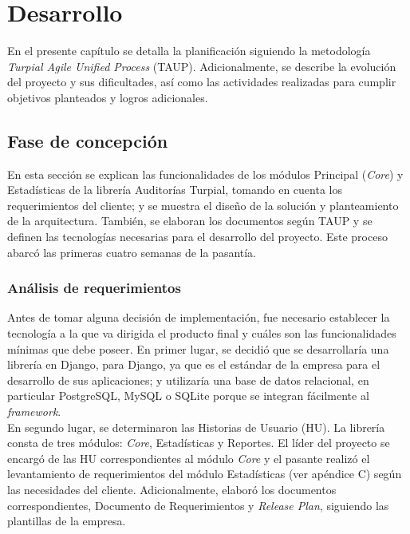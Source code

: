 \chapter{\textbf{Desarrollo}}

\thispagestyle{empty}

En el presente capítulo se detalla la planificación siguiendo la metodología \textit{Turpial Agile Unified Process} (TAUP). Adicionalmente, se describe la evolución del proyecto y sus dificultades, así como las actividades realizadas para cumplir objetivos planteados y logros adicionales.

\section{Fase de concepción}

En esta sección se explican las funcionalidades de los módulos Principal (\textit{Core}) y Estadísticas de la librería Auditorías Turpial, tomando en cuenta los requerimientos del cliente; y se muestra el diseño de la solución y planteamiento de la arquitectura. También, se elaboran los documentos según TAUP y se definen las tecnologías necesarias para el desarrollo del proyecto. Este proceso abarcó las primeras cuatro semanas de la pasantía.

\subsection{Análisis de requerimientos}

Antes de tomar alguna decisión de implementación, fue necesario establecer la tecnología a la que va dirigida el producto final y cuáles son las funcionalidades mínimas que debe poseer. En primer lugar, se decidió que se desarrollaría una librería en Django, para Django, ya que es el estándar de la empresa para el desarrollo de sus aplicaciones; y utilizaría una base de datos relacional, en particular PostgreSQL, MySQL o SQLite porque se integran fácilmente al \textit{framework}. \\

En segundo lugar, se determinaron las Historias de Usuario (HU). La librería consta de tres módulos: \textit{Core}, Estadísticas y Reportes. El líder del proyecto se encargó de las HU correspondientes al módulo \textit{Core} y el pasante realizó el levantamiento de requerimientos del módulo Estadísticas (ver apéndice C) según las necesidades del cliente. Adicionalmente, elaboró los documentos correspondientes, Documento de Requerimientos y \textit{Release Plan}, siguiendo las plantillas de la empresa. \\

